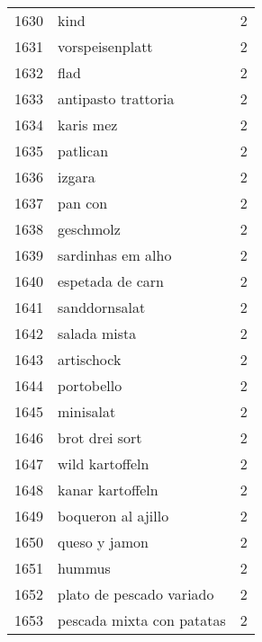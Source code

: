 \begin{tabular}{llr}
1630 &                                               kind &      2 \\
1631 &                                    vorspeisenplatt &      2 \\
1632 &                                               flad &      2 \\
1633 &                                antipasto trattoria &      2 \\
1634 &                                          karis mez &      2 \\
1635 &                                           patlican &      2 \\
1636 &                                             izgara &      2 \\
1637 &                                            pan con &      2 \\
1638 &                                          geschmolz &      2 \\
1639 &                                  sardinhas em alho &      2 \\
1640 &                                   espetada de carn &      2 \\
1641 &                                      sanddornsalat &      2 \\
1642 &                                       salada mista &      2 \\
1643 &                                         artischock &      2 \\
1644 &                                         portobello &      2 \\
1645 &                                          minisalat &      2 \\
1646 &                                     brot drei sort &      2 \\
1647 &                                    wild kartoffeln &      2 \\
1648 &                                   kanar kartoffeln &      2 \\
1649 &                                 boqueron al ajillo &      2 \\
1650 &                                      queso y jamon &      2 \\
1651 &                                             hummus &      2 \\
1652 &                           plato de pescado variado &      2 \\
1653 &                          pescada mixta con patatas &      2 \\

\end{tabular}
